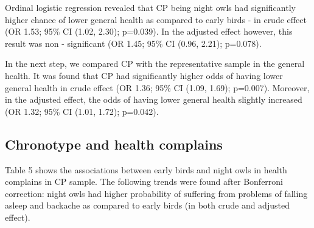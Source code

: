 \documentclass[ijerph,article,accept,moreauthors,pdftex]{mdpi}
\begin{document}
Ordinal logistic regression revealed that CP being night owls had
significantly higher chance of lower general health as compared to early
birds - in crude effect (OR 1.53; 95\% CI (1.02, 2.30); p=0.039). In the
adjusted effect however, this result was non - significant (OR 1.45;
95\% CI (0.96, 2.21); p=0.078).

In the next step, we compared CP with the representative sample in the
general health. It was found that CP had significantly higher odds of
having lower general health in crude effect (OR 1.36; 95\% CI (1.09,
1.69); p=0.007). Moreover, in the adjusted effect, the odds of having
lower general health slightly increased (OR 1.32; 95\% CI (1.01, 1.72);
p=0.042).

\hypertarget{chronotype-and-health-complains}{%
\subsection{Chronotype and health
complains}\label{chronotype-and-health-complains}}

Table 5 shows the associations between early birds and night owls in
health complains in CP sample. The following trends were found after
Bonferroni correction: night owls had higher probability of suffering
from problems of falling asleep and backache as compared to early birds
(in both crude and adjusted effect).

\begin{table}[!h]

\caption{\label{tab:Print regres tab 5}Depicts associations (in Odds rations) between eary bird and night owns and health complains (Sample 3)}
\centering
{}
\end{table}
\end{document}
